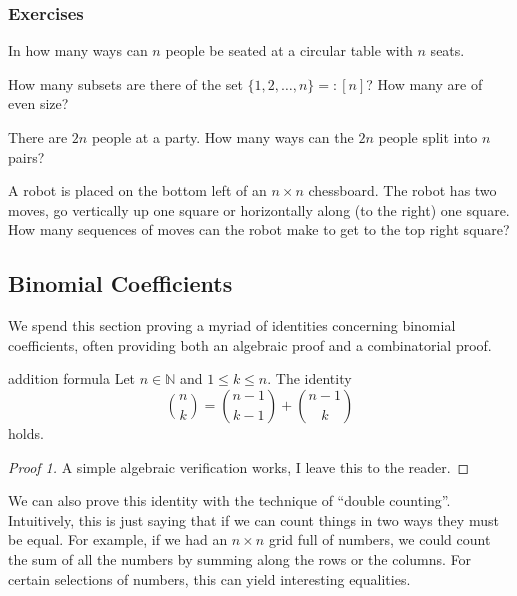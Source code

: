 \documentclass{article}
\newcounter{statementcount}
\begin{document}
\subsubsection*{Exercises}

\begin{exercise}[]{}
    In how many ways can $n$ people be seated at a circular table with $n$ seats.
\end{exercise}

\begin{exercise}[]{}
    How many subsets are there of the set $\{1, 2, \dots, n\} =: [n]$? How many are of even size? 
\end{exercise}

\begin{exercise}[]{}
    There are $2n$ people at a party. How many ways can the $2n$ people split into $n$ pairs? 
\end{exercise}

\begin{exercise}[]{}
    A robot is placed on the bottom left of an $n \times n$ chessboard. The robot has two moves, go vertically up one square or 
    horizontally along (to the right) one square. How many sequences of moves can the robot make to get to the top right square?
\end{exercise}

\newpage

\subsection{Binomial Coefficients}

\setcounter{statementcount}{1}

We spend this section proving a myriad of identities concerning binomial coefficients, often providing both an algebraic proof and 
a combinatorial proof.

\begin{lemma}[]{addition formula}
    Let $n \in \mathbb{N}$ and $1 \leq k \leq n$. The identity \[\binom{n}{k} = \binom{n-1}{k-1} + \binom{n-1}{k}\] holds.
\end{lemma}

\begin{proof}[Proof 1]
    A simple algebraic verification works, I leave this to the reader.
\end{proof}

We can also prove this identity with the technique of ``double counting''. Intuitively, this is just saying that if we can count things in two 
ways they must be equal. For example, if we had an $n \times n$ grid full of numbers, we could count the sum of all the numbers by summing along 
the rows or the columns. For certain selections of numbers, this can yield interesting equalities.  
\end{document}
